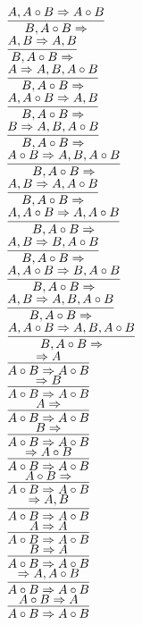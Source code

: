 \documentclass[11pt]{article}
\begin{document}
\begin{center}
\bigskip
\\$\infer{B, A\circ B\Rightarrow }{A, A\circ B\Rightarrow A\circ B}$
\bigskip
\\$\infer{B, A\circ B\Rightarrow }{A, B\Rightarrow A, B}$
\bigskip
\\$\infer{B, A\circ B\Rightarrow }{A\Rightarrow A, B, A\circ B}$
\bigskip
\\$\infer{B, A\circ B\Rightarrow }{A, A\circ B\Rightarrow A, B}$
\bigskip
\\$\infer{B, A\circ B\Rightarrow }{B\Rightarrow A, B, A\circ B}$
\bigskip
\\$\infer{B, A\circ B\Rightarrow }{A\circ B\Rightarrow A, B, A\circ B}$
\bigskip
\\$\infer{B, A\circ B\Rightarrow }{A, B\Rightarrow A, A\circ B}$
\bigskip
\\$\infer{B, A\circ B\Rightarrow }{A, A\circ B\Rightarrow A, A\circ B}$
\bigskip
\\$\infer{B, A\circ B\Rightarrow }{A, B\Rightarrow B, A\circ B}$
\bigskip
\\$\infer{B, A\circ B\Rightarrow }{A, A\circ B\Rightarrow B, A\circ B}$
\bigskip
\\$\infer{B, A\circ B\Rightarrow }{A, B\Rightarrow A, B, A\circ B}$
\bigskip
\\$\infer{B, A\circ B\Rightarrow }{A, A\circ B\Rightarrow A, B, A\circ B}$
\bigskip
\\$\infer{A\circ B\Rightarrow A\circ B}{\Rightarrow A}$
\bigskip
\\$\infer{A\circ B\Rightarrow A\circ B}{\Rightarrow B}$
\bigskip
\\$\infer{A\circ B\Rightarrow A\circ B}{A\Rightarrow }$
\bigskip
\\$\infer{A\circ B\Rightarrow A\circ B}{B\Rightarrow }$
\bigskip
\\$\infer{A\circ B\Rightarrow A\circ B}{\Rightarrow A\circ B}$
\bigskip
\\$\infer{A\circ B\Rightarrow A\circ B}{A\circ B\Rightarrow }$
\bigskip
\\$\infer{A\circ B\Rightarrow A\circ B}{\Rightarrow A, B}$
\bigskip
\\$\infer{A\circ B\Rightarrow A\circ B}{A\Rightarrow A}$
\bigskip
\\$\infer{A\circ B\Rightarrow A\circ B}{B\Rightarrow A}$
\bigskip
\\$\infer{A\circ B\Rightarrow A\circ B}{\Rightarrow A, A\circ B}$
\bigskip
\\$\infer{A\circ B\Rightarrow A\circ B}{A\circ B\Rightarrow A}$
\bigskip

\end{center}
\end{document}
